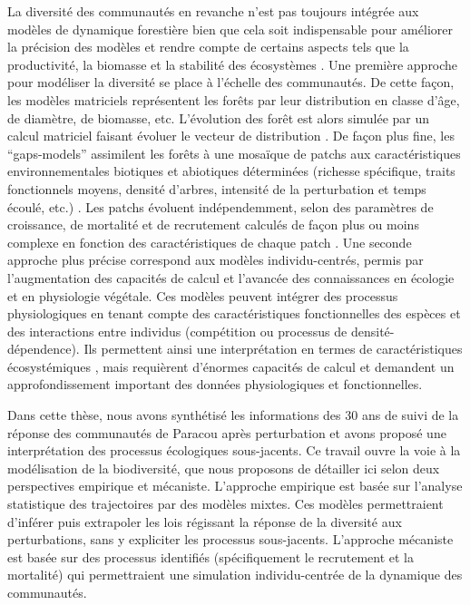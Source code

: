 \documentclass[
  11pt,
  french,
  A4paper,
  extrafontsizes,onecolumn,openright
  ]{memoir}
\begin{document}
La diversité des communautés en revanche n'est pas toujours intégrée aux
modèles de dynamique forestière bien que cela soit indispensable pour
améliorer la précision des modèles et rendre compte de certains aspects
tels que la productivité, la biomasse et la stabilité des écosystèmes
\autocite{Purves2008}. Une première approche pour modéliser la diversité
se place à l'échelle des communautés. De cette façon, les modèles
matriciels représentent les forêts par leur distribution en classe
d'âge, de diamètre, de biomasse, etc. L'évolution des forêt est alors
simulée par un calcul matriciel faisant évoluer le vecteur de
distribution \autocite{Gourlet-Fleury2005}. De façon plus fine, les
``gaps-models'' assimilent les forêts à une mosaïque de patchs aux
caractéristiques environnementales biotiques et abiotiques déterminées
(richesse spécifique, traits fonctionnels moyens, densité d'arbres,
intensité de la perturbation et temps écoulé, etc.)
\autocite{Porte2002}. Les patchs évoluent indépendemment, selon des
paramètres de croissance, de mortalité et de recrutement calculés de
façon plus ou moins complexe en fonction des caractéristiques de chaque
patch \autocite{Fischer2016}. Une seconde approche plus précise
correspond aux modèles individu-centrés, permis par l'augmentation des
capacités de calcul et l'avancée des connaissances en écologie et en
physiologie végétale. Ces modèles peuvent intégrer des processus
physiologiques en tenant compte des caractéristiques fonctionnelles des
espèces et des interactions entre individus (compétition ou processus de
densité-dépendence). Ils permettent ainsi une interprétation en termes
de caractéristiques écosystémiques \autocite[@][]{Marechaux2017}, mais
requièrent d'énormes capacités de calcul et demandent un
approfondissement important des données physiologiques et
fonctionnelles.

Dans cette thèse, nous avons synthétisé les informations des 30 ans de
suivi de la réponse des communautés de Paracou après perturbation et
avons proposé une interprétation des processus écologiques sous-jacents.
Ce travail ouvre la voie à la modélisation de la biodiversité, que nous
proposons de détailler ici selon deux perspectives empirique et
mécaniste. L'approche empirique est basée sur l'analyse statistique des
trajectoires par des modèles mixtes. Ces modèles permettraient d'inférer
puis extrapoler les lois régissant la réponse de la diversité aux
perturbations, sans y expliciter les processus sous-jacents. L'approche
mécaniste est basée sur des processus identifiés (spécifiquement le
recrutement et la mortalité) qui permettraient une simulation
individu-centrée de la dynamique des communautés.
\end{document}
